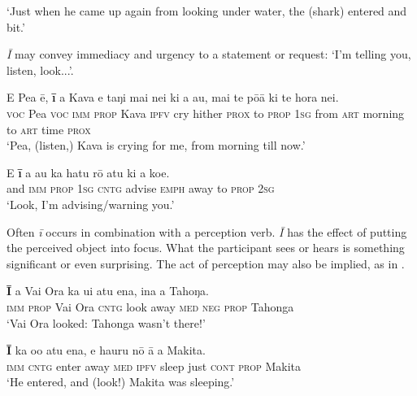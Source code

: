 \glt
‘Just when he came up again from looking under water, the (shark) entered and bit.’ \textstyleExampleref{[R361.016]} 
\z

\textit{{\ꞌ}Ī} may convey immediacy and urgency to a statement or request: ‘I’m telling you, listen, look...’.

\ea\label{ex:4.149}
\gll E Pea ē, \textbf{{\ꞌ}ī} a Kava e taŋi mai nei ki a au,  mai te pō{\ꞌ}ā ki te hora nei.\\
\textsc{voc} Pea \textsc{voc} \textsc{imm} \textsc{prop} Kava \textsc{ipfv} cry hither \textsc{prox} to \textsc{prop} \textsc{1sg}  from \textsc{art} morning to \textsc{art} time \textsc{prox}\\

\glt 
‘Pea, (listen,) Kava is crying for me, from morning till now.’ \textstyleExampleref{[R229.017]} 
\z

\ea\label{ex:4.150}
\gll {\ꞌ}E \textbf{{\ꞌ}ī} a au ka hatu rō atu ki a koe. \\
and \textsc{imm} \textsc{prop} \textsc{1sg} \textsc{cntg} advise \textsc{emph} away to \textsc{prop} \textsc{2sg} \\

\glt 
‘Look, I’m advising/warning you.’ \textstyleExampleref{[R310.294]} 
\z

Often \textit{{\ꞌ}ī} occurs in combination with a perception verb. \textit{{\ꞌ}Ī} has the effect of putting the perceived object into focus. What the participant sees or hears is something significant or even surprising. The act of perception may also be implied, as in .

\ea\label{ex:4.151}
\gll \textbf{{\ꞌ}Ī} a Vai Ora ka u{\ꞌ}i atu ena, {\ꞌ}ina a Tahoŋa. \\
\textsc{imm} \textsc{prop} Vai Ora \textsc{cntg} look away \textsc{med} \textsc{neg} \textsc{prop} Tahonga \\

\glt 
‘Vai Ora looked: Tahonga wasn’t there!’ \textstyleExampleref{[R301.164]} 
\z

\ea\label{ex:4.152}
\gll \textbf{{\ꞌ}Ī} ka o{\ꞌ}o atu ena, e ha{\ꞌ}uru nō {\ꞌ}ā a Makita. \\
\textsc{imm} \textsc{cntg} enter away \textsc{med} \textsc{ipfv} sleep just \textsc{cont} \textsc{prop} Makita \\

\glt
‘He entered, and (look!) Makita was sleeping.’ \textstyleExampleref{[R243.183]} 
\z

